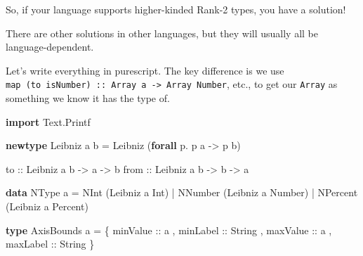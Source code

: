 \documentclass[]{article}
\newenvironment{Shaded}{}{}
\newcommand{\DataTypeTok}[1]{\textcolor[rgb]{0.56,0.13,0.00}{#1}}
\newcommand{\KeywordTok}[1]{\textcolor[rgb]{0.00,0.44,0.13}{\textbf{#1}}}
\newcommand{\NormalTok}[1]{#1}
\newcommand{\OperatorTok}[1]{\textcolor[rgb]{0.40,0.40,0.40}{#1}}
\newcommand{\OtherTok}[1]{\textcolor[rgb]{0.00,0.44,0.13}{#1}}
\begin{document}
So, if your language supports higher-kinded Rank-2 types, you have a solution!

There are other solutions in other languages, but they will usually all be
language-dependent.

Let's write everything in purescript. The key difference is we use
\texttt{map\ (to\ isNumber)\ ::\ Array\ a\ -\textgreater{}\ Array\ Number},
etc., to get our \texttt{Array} as something we know it has the type of.

\begin{Shaded}
\begin{Highlighting}[]
\KeywordTok{import} \DataTypeTok{Text.Printf}

\KeywordTok{newtype} \DataTypeTok{Leibniz}\NormalTok{ a b }\OtherTok{=} \DataTypeTok{Leibniz}\NormalTok{ (}\KeywordTok{forall}\NormalTok{ p}\OperatorTok{.}\NormalTok{ p a }\OtherTok{{-}\textgreater{}}\NormalTok{ p b)}

\OtherTok{to ::} \DataTypeTok{Leibniz}\NormalTok{ a b }\OtherTok{{-}\textgreater{}}\NormalTok{ a }\OtherTok{{-}\textgreater{}}\NormalTok{ b}
\OtherTok{from ::} \DataTypeTok{Leibniz}\NormalTok{ a b }\OtherTok{{-}\textgreater{}}\NormalTok{ b }\OtherTok{{-}\textgreater{}}\NormalTok{ a}

\KeywordTok{data} \DataTypeTok{NType}\NormalTok{ a }\OtherTok{=}
    \DataTypeTok{NInt}\NormalTok{ (}\DataTypeTok{Leibniz}\NormalTok{ a }\DataTypeTok{Int}\NormalTok{)}
  \OperatorTok{|} \DataTypeTok{NNumber}\NormalTok{ (}\DataTypeTok{Leibniz}\NormalTok{ a }\DataTypeTok{Number}\NormalTok{)}
  \OperatorTok{|} \DataTypeTok{NPercent}\NormalTok{ (}\DataTypeTok{Leibniz}\NormalTok{ a }\DataTypeTok{Percent}\NormalTok{)}

\KeywordTok{type} \DataTypeTok{AxisBounds}\NormalTok{ a }\OtherTok{=}
\NormalTok{    \{}\OtherTok{ minValue ::}\NormalTok{ a}
\NormalTok{    ,}\OtherTok{ minLabel ::} \DataTypeTok{String}
\NormalTok{    ,}\OtherTok{ maxValue ::}\NormalTok{ a}
\NormalTok{    ,}\OtherTok{ maxLabel ::} \DataTypeTok{String}
\NormalTok{    \}}


\end{Highlighting}
\end{Shaded}
\end{document}

